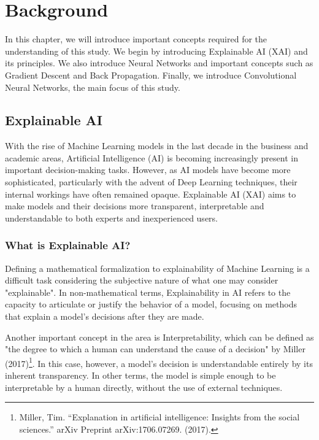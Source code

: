 


\enlargethispage{-1\baselineskip}

\chapter{Background}

In this chapter, we will introduce important concepts required for the understanding of this study.
We begin by introducing Explainable AI (XAI) and its principles. We also introduce Neural Networks and important concepts such as Gradient Descent and Back Propagation. 
Finally, we introduce Convolutional Neural Networks, the main focus of this study.

\section{Explainable AI}

With the rise of Machine Learning models in the last decade in the business and academic areas, Artificial Intelligence (AI) is becoming increasingly present in important decision-making tasks. 
However, as AI models have become more sophisticated, particularly with the advent of Deep Learning techniques, their internal workings have often remained opaque. 
Explainable AI (XAI) aims to make models and their decisions more transparent, interpretable and understandable to both experts and inexperienced users.

\subsection{What is Explainable AI?}

Defining a mathematical formalization to explainability of Machine Learning is a difficult task considering the subjective nature of what one may consider "explainable". In non-mathematical terms, 
Explainability in AI refers to the capacity to articulate or justify the behavior of a model, focusing on methods that explain a model's decisions after they are made.

Another important concept in the area is Interpretability, which can be defined as "the degree to which a human can understand the cause of a decision" by Miller (2017)\footnote[1]{Miller, Tim. “Explanation in artificial intelligence: Insights from the social sciences.” arXiv Preprint arXiv:1706.07269. (2017).}.
In this case, however, a model's decision is understandable entirely by its inherent transparency. In other terms, the model is simple enough to be interpretable by a human directly, without the use of external techniques.

